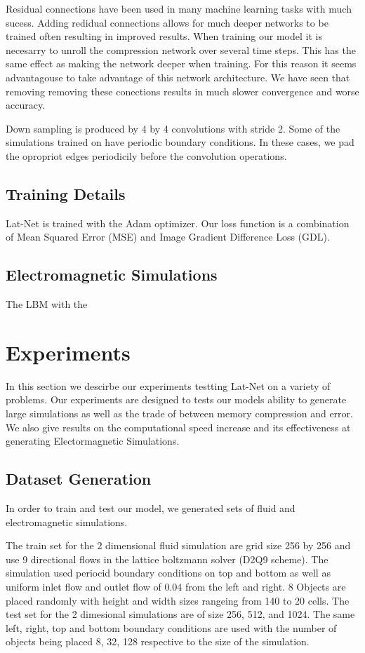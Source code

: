 \documentclass{article}
\begin{document}
Residual connections have been used in many machine learning tasks with much sucess. Adding redidual connections allows for much deeper networks to be trained often resulting in improved results. When training our model it is necesarry to unroll the compression network over several time steps. This has the same effect as making the network deeper when training. For this reason it seems advantagouse to take advantage of this network architecture. We have seen that removing removing these conections results in much slower convergence and worse accuracy.

Down sampling is produced by 4 by 4 convolutions with stride 2. Some of the simulations trained on have periodic boundary conditions. In these cases, we pad the opropriot edges periodicily before the convolution operations.


\subsection{Training Details}

Lat-Net is trained with the Adam optimizer. 
Our loss function is a combination of Mean Squared Error (MSE) and Image Gradient Difference Loss (GDL)\cite{mathieu2015deep}.

\subsection{Electromagnetic Simulations}

The LBM with the 

\section{Experiments}

In this section we descirbe our experiments testting Lat-Net on a variety of problems. Our experiments are designed to tests our models ability to generate large simulations as well as the trade of between memory compression and error. We also give results on the computational speed increase and its effectiveness at generating Electormagnetic Simulations.

\subsection{Dataset Generation}
In order to train and test our model, we generated sets of fluid and electromagnetic simulations.

The train set for the 2 dimensional fluid simulation are grid size 256 by 256 and use 9 directional flows in the lattice boltzmann solver (D2Q9 scheme). The simulation used periocid boundary conditions on top and bottom as well as uniform inlet flow and outlet flow of 0.04 from the left and right. 8 Objects are placed randomly with height and width sizes rangeing from 140 to 20 cells. The test set for the 2 dimesional simulations are of size 256, 512, and 1024. The same left, right, top and bottom boundary conditions are used with the number of objects being placed 8, 32, 128 respective to the size of the simulation. 
\end{document}
